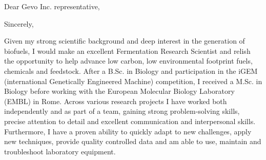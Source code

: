 \documentclass[11pt,a4paper,sans]{moderncv}
\begin{document}
\date{\today}
\opening{Dear Gevo Inc. representative,\vspace{-2mm}}
\closing{Sincerely,\vspace*{-4mm} }
\makelettertitle
\begin{spacing}{1.15}

Given my strong scientific background and deep interest in the generation of biofuels, I would make an excellent Fermentation Research Scientist and relish the opportunity to help advance low carbon, low environmental footprint fuels, chemicals and feedstock. After a B.Sc. in Biology and participation in the iGEM (international Genetically Engineered Machine) competition, I received a M.Sc. in Biology before working with the European Molecular Biology Laboratory (EMBL) in Rome. Across various research projects I have worked both independently and as part of a team, gaining strong problem-solving skills, precise attention to detail and excellent communication and interpersonal skills. Furthermore, I have a proven ability to quickly adapt to new challenges, apply new techniques, provide quality controlled data and am able to use, maintain and troubleshoot laboratory equipment.\par\vspace*{2mm}


\end{spacing}
\end{document}

